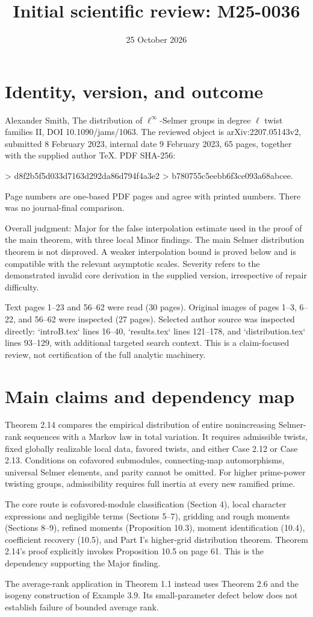 \documentclass[10pt]{article}
\title{Initial scientific review: M25-0036}
\author{}
\date{25 October 2026}
\begin{document}
\maketitle
\section*{Identity, version, and outcome}
Alexander Smith, The distribution of \(\ell^\infty\)-Selmer groups in degree \(\ell\) twist families II, DOI 10.1090/jams/1063. The reviewed object is arXiv:2207.05143v2, submitted 8 February 2023, internal date 9 February 2023, 65 pages, together with the supplied author TeX. PDF SHA-256:\par
> d8f2b5f5d033d7163d292da86d794f4a3e2
> b780755c5eebb6f3ce093a68abcee.\par
Page numbers are one-based PDF pages and agree with printed numbers. There was no journal-final comparison.\par
Overall judgment: Major for the false interpolation estimate used in the proof of the main theorem, with three local Minor findings. The main Selmer distribution theorem is not disproved. A weaker interpolation bound is proved below and is compatible with the relevant asymptotic scales. Severity refers to the demonstrated invalid core derivation in the supplied version, irrespective of repair difficulty.\par
Text pages 1–23 and 56–62 were read (30 pages). Original images of pages 1–3, 6–22, and 56–62 were inspected (27 pages). Selected author source was inspected directly: `introB.tex` lines 16–40, `results.tex` lines 121–178, and `distribution.tex` lines 93–129, with additional targeted search context. This is a claim-focused review, not certification of the full analytic machinery.\par
\section*{Main claims and dependency map}
Theorem 2.14 compares the empirical distribution of entire nonincreasing Selmer-rank sequences with a Markov law in total variation. It requires admissible twists, fixed globally realizable local data, favored twists, and either Case 2.12 or Case 2.13. Conditions on cofavored submodules, connecting-map automorphisms, universal Selmer elements, and parity cannot be omitted. For higher prime-power twisting groups, admissibility requires full inertia at every new ramified prime.\par
The core route is cofavored-module classification (Section 4), local character expressions and negligible terms (Sections 5–7), gridding and rough moments (Sections 8–9), refined moments (Proposition 10.3), moment identification (10.4), coefficient recovery (10.5), and Part I’s higher-grid distribution theorem. Theorem 2.14’s proof explicitly invokes Proposition 10.5 on page 61. This is the dependency supporting the Major finding.\par
The average-rank application in Theorem 1.1 instead uses Theorem 2.6 and the isogeny construction of Example 3.9. Its small-parameter defect below does not establish failure of bounded average rank.\par
\end{document}
